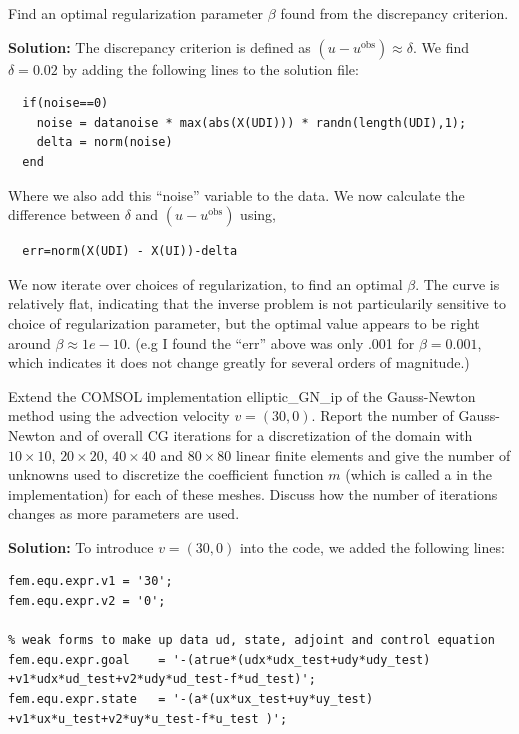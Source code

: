 \documentclass[11pt]{article}
\newenvironment{solution}{\begin{trivlist}\item[]{\bf Solution:}}
                      {\end{trivlist}}
\begin{document}
\begin{enumerate}
\item[(a)]Find an optimal regularization parameter $\beta$ found from the
	  discrepancy criterion.

\begin{solution}
The discrepancy criterion is defined as $(u-u^{\text{obs}}) \approx
 \delta$. We find $\delta = 0.02$ by adding the following lines to the
 solution file: 
 \begin{lstlisting}
  if(noise==0)
    noise = datanoise * max(abs(X(UDI))) * randn(length(UDI),1);
    delta = norm(noise)
  end
 \end{lstlisting}
 Where we also add this ``noise'' variable to the data. We now calculate
 the difference between $\delta$ and $(u-u^{\text{obs}})$ using, 
 \begin{lstlisting}
  err=norm(X(UDI) - X(UI))-delta
 \end{lstlisting}
We now iterate over choices of regularization, to find an optimal
 $\beta$. The curve is relatively flat, indicating that the inverse
 problem is not particularily sensitive to choice of regularization
 parameter, but the optimal value appears to be right around $\beta
 \approx 1e-10$. (e.g I found the ``err'' above was only .001 for $\beta
 = 0.001$, which indicates it does not change greatly for several orders
 of magnitude.)
 
\end{solution}


\item[(b)]Extend the COMSOL implementation elliptic\_GN\_ip of the
	  Gauss-Newton method using the advection velocity
	  $v=(30,0)$. Report the number of Gauss-Newton and of overall
	  CG iterations for a discretization of the domain with $10
	  \times 10$, $20 \times 20$, $40 \times 40$ and $80 \times 80$
	  linear finite elements and give the number of unknowns used to
	  discretize the coefficient function $m$ (which is called a in
	  the implementation) for each of these meshes. Discuss how the
	  number of iterations changes as more parameters are used. 

\begin{solution}
To introduce $v=(30,0)$ into the code, we added the following lines:
\begin{lstlisting}
fem.equ.expr.v1 = '30';
fem.equ.expr.v2 = '0';

% weak forms to make up data ud, state, adjoint and control equation
fem.equ.expr.goal    = '-(atrue*(udx*udx_test+udy*udy_test)
+v1*udx*ud_test+v2*udy*ud_test-f*ud_test)';
fem.equ.expr.state   = '-(a*(ux*ux_test+uy*uy_test)
+v1*ux*u_test+v2*uy*u_test-f*u_test )';


\end{lstlisting}
\end{solution}
\end{enumerate}
\end{document}
